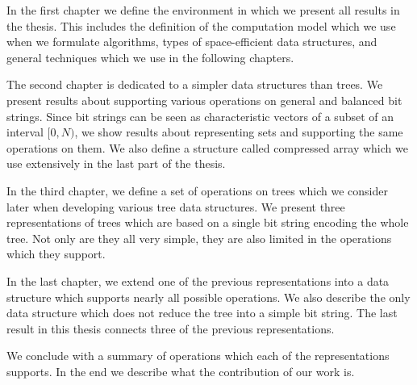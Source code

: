 In the first chapter we define the environment in which we present all results in the thesis.
This includes the definition of the computation model which we use when we formulate algorithms, types of space-efficient data structures, and general techniques which we use in the following chapters.

The second chapter is dedicated to a simpler data structures than trees.
We present results about supporting various operations on general and balanced bit strings.
Since bit strings can be seen as characteristic vectors of a subset of an interval $[0, N)$, we show results about representing sets and supporting the same operations on them.
We also define a structure called compressed array which we use extensively in the last part of the thesis.

In the third chapter, we define a set of operations on trees which we consider later when developing various tree data structures.
We present three representations of trees which are based on a single bit string encoding the whole tree.
Not only are they all very simple, they are also limited in the operations which they support.

In the last chapter, we extend one of the previous representations into a data structure which supports nearly all possible operations.
We also describe the only data structure which does not reduce the tree into a simple bit string.
The last result in this thesis connects three of the previous representations.

We conclude with a summary of operations which each of the representations supports.
In the end we describe what the contribution of our work is.